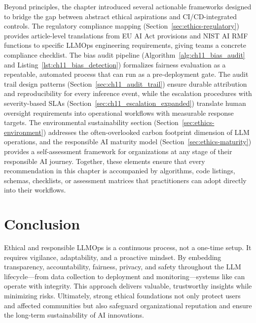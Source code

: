 Beyond principles, the chapter introduced several actionable frameworks designed to bridge the gap between abstract ethical
aspirations and CI/CD-integrated controls. The regulatory compliance mapping (Section~\ref{sec:ethics-regulatory})
provides article-level translations from EU AI Act provisions and NIST AI RMF functions to specific LLMOps engineering
requirements, giving teams a concrete compliance checklist. The bias audit pipeline
(Algorithm~\ref{alg:ch11_bias_audit} and Listing~\ref{lst:ch11_bias_detection}) formalizes fairness evaluation as a
repeatable, automated process that can run as a pre-deployment gate. The audit trail design patterns
(Section~\ref{sec:ch11_audit_trail}) ensure durable attribution and reproducibility for every inference event, while the
escalation procedures with severity-based SLAs (Section~\ref{sec:ch11_escalation_expanded}) translate human oversight
requirements into operational workflows with measurable response targets. The environmental sustainability section
(Section~\ref{sec:ethics-environment}) addresses the often-overlooked carbon footprint dimension of LLM operations, and
the responsible AI maturity model (Section~\ref{sec:ethics-maturity}) provides a self-assessment framework for
organizations at any stage of their responsible AI journey. Together, these elements ensure that every recommendation in
this chapter is accompanied by algorithms, code listings, schemas, checklists, or assessment matrices that practitioners
can adopt directly into their workflows.

\section{Conclusion}\label{sec:ethics-conclusion}
Ethical and responsible LLMOps is a continuous process, not a one-time setup. It requires vigilance, adaptability, and a proactive mindset. By embedding transparency, accountability, fairness, privacy, and safety throughout the LLM lifecycle---from data collection to deployment and monitoring---systems like \ishtar{} can operate with integrity. This approach delivers valuable, trustworthy insights while minimizing risks. Ultimately, strong ethical foundations not only protect users and affected communities but also safeguard organizational reputation and ensure the long-term sustainability of AI innovations.

